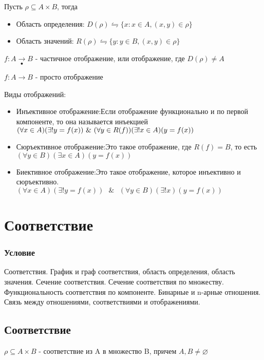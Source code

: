 \documentclass{report}
\newcommand{\band}{\mbox{ } \& \mbox{ }}
\begin{document}
Пусть $\rho \subseteq A \times B$, тогда
\begin{itemize}
    \item Область определения: $D(\rho) \leftrightharpoons \{x:x \in A, (x,y) \in \rho\}$
    \item Область значений: $R(\rho) \leftrightharpoons \{y:y \in B, (x,y) \in \rho\}$
\end{itemize}

$f: A \underset{\bullet}{\rightarrow} B$ - частичное отображение, или отображение, где $D(\rho) \neq A$

$f: A \rightarrow B$ - просто отображение

Виды отображений:
\begin{itemize}
    \item Инъективное отображение:\newline Если отображение функционально и по первой компоненте, то она называется инъекцией\newline
          $(\forall x \in A)(\exists!\space y = f(x)) \band (\forall y \in R(f))(\exists!\space x \in A)(y = f(x))$
    \item Сюръективное отображение:\newline Это такое отображение, где $R(f) = B$, то есть\newline
          $(\forall y \in B)(\exists x \in A)(y = f(x))$
    \item Биективное отображение:\newline Это такое отображение, которое инъективно и сюръективно.\newline
          $(\forall x \in A)(\exists! y = f(x)) \band (\forall y \in B)(\exists! x)(y = f(x))$
\end{itemize}
\newpage

\section{Соответствие}
\subsubsection{Условие}
Соответствия. График и граф соответствия, область определения, область значения.
Сечение соответствия. Сечение соответствия по множеству. Функциональность
соответствия по компоненте. Бинарные и n-арные отношения. Связь между
отношениями, соответствиями и отображениями.

\subsection{Соответствие}
$\rho \subseteq A \times B$ - соответствие из A в множество B, причем $A,B \neq \varnothing$
\end{document}
